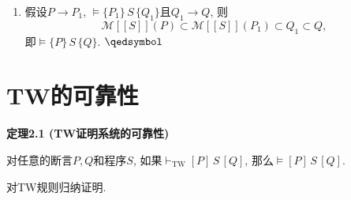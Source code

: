 \documentclass[UTF8]{ctexart}
\begin{document}
\begin{enumerate}
    \hspace{2.17em}
    首先$\mathcal{M}[\![A^0]\!](P)=\varnothing$; 假设命题对$k$成立, 那么
    \vspace{3pt}
    \[\begin{aligned}
        \mathcal{M}[\![A^{k+1}]\!](P)=\,&
        \mathcal{M}[\![\,\mathbf{if}\,\,B\,\,\mathbf{then}\,\,S;A^k\,\,
        \mathbf{else}\,\,\mathrm{skip}\,\,\mathbf{fi}\,]\!](P)\\
        =\,&\mathcal{M}[\![S;A^k]\!](P\land B)\cup
        \mathcal{M}[\![\mathrm{skip}]\!](P\land\neg\,B)\\
        =\,&\mathcal{M}[\![A^k]\!]\mathcal{M}[\![S]\!](P\land B)
        \cup(P\land\neg\,B)\\
        \subset\,&\mathcal{M}[\![A^k]\!](P)\cup(P\land\neg\,B)
        =P\land\neg\,B,\\[3pt]
    \end{aligned}\]
    归纳成立, 所以
    \[
        \mathcal{M}[\![\,\mathbf{while}\,\,B\,\,\mathbf{do}\,\,
        S\,\,\mathbf{od}\,]\!](P)=\bigcup_{k\in\mathbb{N}}\mathcal{M}
        [\![A^k]\!](P)\subset P\land\neg\,B,\\[-5pt]
    \]
    即$\models\{P\}\,\mathbf{while}\,\,B\,\,\mathbf{do}\,\,S
    \,\,\mathbf{od}\,\{P\land\neg\,B\}$.
    
    \item 假设$P\to P_1$, $\models\{P_1\}\,S\,\{Q_1\}$且$Q_1\to Q$, 则
    \[
        \mathcal{M}[\![S]\!](P)\subset\mathcal{M}[\![S]\!](P_1)
        \subset Q_1\subset Q,
    \]
    即$\models\{P\}\,S\,\{Q\}$. \hfill $\qedsymbol$
\end{enumerate}





\newpage

\section{TW的可靠性}

\hypertarget{sec:定理2.1}{}
\noindent\textbf{定理2.1 (TW证明系统的可靠性)}

对任意的断言$P,Q$和程序$S$, 如果$\vdash_{\mathrm{TW}}[P]\,S\,[Q]$,
那么$\models[P]\,S\,[Q]$.


对TW规则归纳证明.
\end{document}
